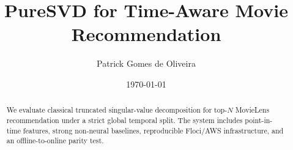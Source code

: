 \documentclass[10pt,twocolumn]{article}
\title{PureSVD for Time-Aware Movie Recommendation}
\author{Patrick Gomes de Oliveira}
\date{\today}
\begin{document}
\maketitle
\begin{abstract}
We evaluate classical truncated singular-value decomposition for top-$N$
MovieLens recommendation under a strict global temporal split. The system
includes point-in-time features, strong non-neural baselines, reproducible
Floci/AWS infrastructure, and an offline-to-online parity test.
\end{abstract}









\end{document}
